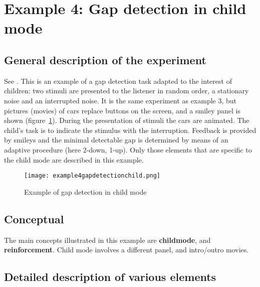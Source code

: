 \newpage
\section{Example 4: Gap detection in child mode}

\subsection{General description of the experiment}
See . This is an
example of a gap detection task adapted to the interest of
children: two stimuli are presented to the listener in random
order, a stationary noise and an interrupted noise. It is the same
experiment as example 3, but pictures (movies) of cars replace
buttons on the screen, and a smiley panel is
shown (figure~\ref{fig:gapchild}). During the presentation of
stimuli the cars are animated. The child's task is to indicate the
stimulus with the interruption. Feedback is provided by smileys
and the minimal detectable gap is determined by means of an
adaptive procedure (here 2-down, 1-up). Only those elements that
are specific to the child mode are described in this example.


\begin{figure}
 \centering
\texttt{[image: example4gapdetectionchild.png]}
 \caption{Example of gap detection in child mode}
 \label{fig:gapchild}
\end{figure}

\subsection{Conceptual}
The main concepts illustrated in this example are
\textbf{childmode}, and \textbf{reinforcement}. Child mode
involves a different panel, and intro/outro movies.

\subsection{Detailed description of various elements}

